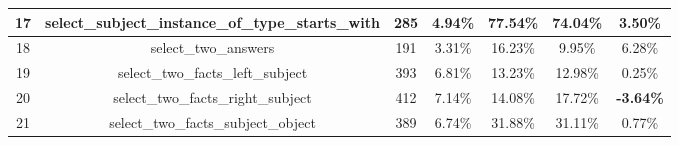 \begin{table}[h!]
{\begin{tabular}{|c|c|cc|cc|c|}
    17                           & select\_subject\_instance\_of\_type\_starts\_with                                                                      & 285                                                 & 4.94\%                                                                          & 77.54\%                                                                                                & 74.04\%                                                                                & 3.50\%                                  \\ \hline
    18                           & select\_two\_answers                                                                                                   & 191                                                 & 3.31\%                                                                          & 16.23\%                                                                                                & 9.95\%                                                                                 & 6.28\%                                  \\ \hline
    19                           & select\_two\_facts\_left\_subject                                                                                      & 393                                                 & 6.81\%                                                                          & 13.23\%                                                                                                & 12.98\%                                                                                & 0.25\%                                  \\ \hline
    20                           & select\_two\_facts\_right\_subject                                                                                     & 412                                                 & 7.14\%                                                                          & 14.08\%                                                                                                & 17.72\%                                                                                & \textbf{-3.64\%}                        \\ \hline
    21                           & select\_two\_facts\_subject\_object                                                                                    & 389                                                 & 6.74\%                                                                          & 31.88\%                                                                                                & 31.11\%                                                                                & 0.77\%                                  \\ \hline

\end{tabular}}
\end{table}
